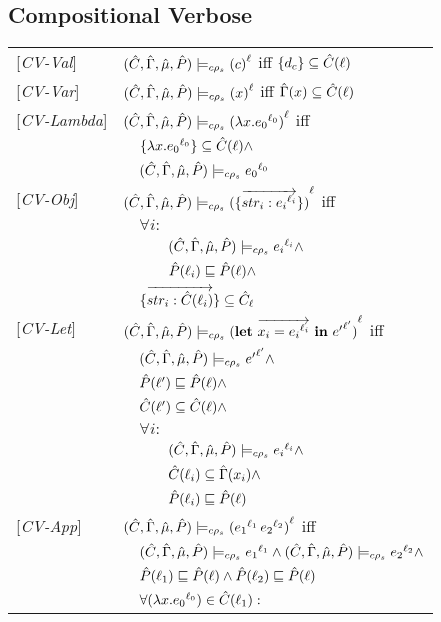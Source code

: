 \subsection{Compositional Verbose}
\begin{tabular}{l l l l}
{[\textit{CV-Val}]}&\multicolumn{3}{l}{$ \ccestl {c} $ iff $\{d_c\} \subseteq \Cat(\ell)$} \\ 
{[\textit{CV-Var}]}&\multicolumn{3}{l}{$ \ccestl {x} $ iff $\Env(x) \subseteq \Cat(\ell)$} \\ 
{[\textit{CV-Lambda}]}&\multicolumn{3}{l}{$ \ccestl {\lam{x}{\lbt 0}} $ iff}\\
&&\multicolumn{2}{l}{$\{\lam{x}{\lbt 0}\} \subseteq \Cat(\ell) \wedge $}\\
&&\multicolumn{2}{l}{$ \ccest {\lbt 0}$}\\
{[\textit{CV-Obj}]}&\multicolumn{3}{l}{$ \ccestl {\rec{\vec{str_i : \lbt i}}}$ iff}\\
&&\multicolumn{2}{l}{$\forall i:$}\\
&&&$\ccest {\lbt i} \wedge$\\
&&&$\Pat(\ell_i) \sqsubseteq \Pat(\ell) \wedge$\\ 
&&\multicolumn{2}{l}{$\rec{\vec{str_i : \Cat(\ell_i)}} \subseteq \Cat_\ell $} \\
{[\textit{CV-Let}]}&\multicolumn{3}{l}{$ \ccestl {\letexprs{x_i}{\lbt i}{{e'}^{\ell'}}}$ iff}\\
&&\multicolumn{2}{l}{$ \ccest {{e'}^{\ell'}} \wedge$} \\
&&\multicolumn{2}{l}{$ \Pat(\ell') \sqsubseteq \Pat(\ell) \wedge$}\\
&&\multicolumn{2}{l}{$ \Cat(\ell') \subseteq \Cat(\ell) \wedge$}\\
&&\multicolumn{2}{l}{$ \forall i:$}\\
&&&$\ccest {{e_i}^{\ell_i}} \wedge$ \\
&&& $ \Cat(\ell_i) \subseteq \Env(x_i) \wedge$ \\
&&& $ \Pat(\ell_i) \sqsubseteq \Pat(\ell) $ \\
{[\textit{CV-App}]}&\multicolumn{3}{l}{$ \ccestl {\appl {\lbt 1} {\lbt 2}}$ iff}\\
&&\multicolumn{2}{l}{$\ccest {\lbt 1} \wedge \ccest {\lbt 2} \wedge$} \\
&&\multicolumn{2}{l}{$\Pat(\ell_1) \sqsubseteq \Pat(\ell) \wedge \Pat(\ell_2) \sqsubseteq \Pat(\ell)$} \\
&&\multicolumn{2}{l}{$\forall (\lam{x}{\lbt 0}) \in \Cat(\ell_1) :$}\\

\end{tabular}
